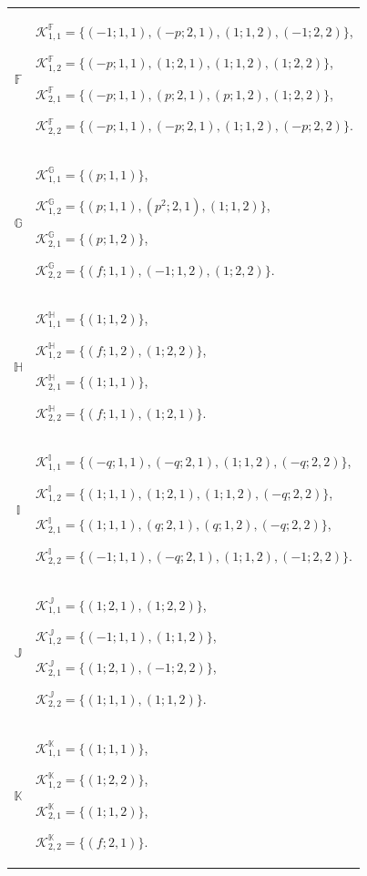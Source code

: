 \documentclass{amsart}
\theoremstyle{definition}
\theoremstyle{remark}
\numberwithin{equation}{section}
\begin{document}
\begin{center}
\begin{longtable}{c|p{}}
$\mathbb{F}$ &
$\mathscr{K}_{1,1}^{\mathbb{F}}=\{(-1;1,1),(-p;2,1),(1;1,2),(-1;2,2)\}$,

$\mathscr{K}_{1,2}^{\mathbb{F}}=\{(-p;1,1),(1;2,1),(1;1,2),(1;2,2)\}$,

$\mathscr{K}_{2,1}^{\mathbb{F}}=\{(-p;1,1),(p;2,1),(p;1,2),(1;2,2)\}$,

$\mathscr{K}_{2,2}^{\mathbb{F}}=\{(-p;1,1),(-p;2,1),(1;1,2),(-p;2,2)\}$.
\\

$\mathbb{G}$ &
$\mathscr{K}_{1,1}^{\mathbb{G}}=\{(p;1,1)\}$,

$\mathscr{K}_{1,2}^{\mathbb{G}}=\{(p;1,1),(p^2;2,1),(1;1,2)\}$,

$\mathscr{K}_{2,1}^{\mathbb{G}}=\{(p;1,2)\}$,

$\mathscr{K}_{2,2}^{\mathbb{G}}=\{(f;1,1),(-1;1,2),(1;2,2)\}$.
\\

$\mathbb{H}$ &
$\mathscr{K}_{1,1}^{\mathbb{H}}=\{(1;1,2)\}$,

$\mathscr{K}_{1,2}^{\mathbb{H}}=\{(f;1,2),(1;2,2)\}$,

$\mathscr{K}_{2,1}^{\mathbb{H}}=\{(1;1,1)\}$,

$\mathscr{K}_{2,2}^{\mathbb{H}}=\{(f;1,1),(1;2,1)\}$.
\\

$\mathbb{I}$ &
$\mathscr{K}_{1,1}^{\mathbb{I}}=\{(-q;1,1),(-q;2,1),(1;1,2),(-q;2,2)\}$,

$\mathscr{K}_{1,2}^{\mathbb{I}}=\{(1;1,1),(1;2,1),(1;1,2),(-q;2,2)\}$,

$\mathscr{K}_{2,1}^{\mathbb{I}}=\{(1;1,1),(q;2,1),(q;1,2),(-q;2,2)\}$,

$\mathscr{K}_{2,2}^{\mathbb{I}}=\{(-1;1,1),(-q;2,1),(1;1,2),(-1;2,2)\}$.
\\

$\mathbb{J}$ &
$\mathscr{K}_{1,1}^{\mathbb{J}}=\{(1;2,1),(1;2,2)\}$,

$\mathscr{K}_{1,2}^{\mathbb{J}}=\{(-1;1,1),(1;1,2)\}$,

$\mathscr{K}_{2,1}^{\mathbb{J}}=\{(1;2,1),(-1;2,2)\}$,

$\mathscr{K}_{2,2}^{\mathbb{J}}=\{(1;1,1),(1;1,2)\}$.
\\

$\mathbb{K}$ &
$\mathscr{K}_{1,1}^{\mathbb{K}}=\{(1;1,1)\}$,

$\mathscr{K}_{1,2}^{\mathbb{K}}=\{(1;2,2)\}$,

$\mathscr{K}_{2,1}^{\mathbb{K}}=\{(1;1,2)\}$,

$\mathscr{K}_{2,2}^{\mathbb{K}}=\{(f;2,1)\}$.
\\


\end{longtable}
\end{center}
\end{document}
